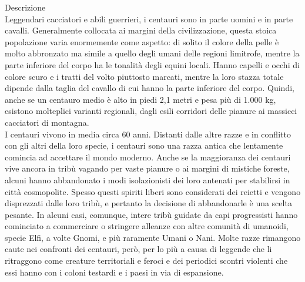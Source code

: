 \begin{multicols}{2}
Descrizione\\
Leggendari cacciatori e abili guerrieri, i centauri sono in parte uomini e in parte cavalli. Generalmente collocata ai margini della civilizzazione, questa stoica popolazione varia enormemente come aspetto: di solito il colore della pelle è molto abbronzato ma simile a quello degli umani delle regioni limitrofe, mentre la parte inferiore del corpo ha le tonalità degli equini locali. Hanno capelli e occhi di colore scuro e i tratti del volto piuttosto marcati, mentre la loro stazza totale dipende dalla taglia del cavallo di cui hanno la parte inferiore del corpo. Quindi, anche se un centauro medio è alto in piedi 2,1 metri e pesa più di 1.000 kg, esistono molteplici varianti regionali, dagli esili corridori delle pianure ai massicci cacciatori di montagna.\\
I centauri vivono in media circa 60 anni. Distanti dalle altre razze e in conflitto con gli altri della loro specie, i centauri sono una razza antica che lentamente comincia ad accettare il mondo moderno. Anche se la maggioranza dei centauri vive ancora in tribù vagando per vaste pianure o ai margini di mistiche foreste, alcuni hanno abbandonato i modi isolazionisti dei loro antenati per stabilirsi in città cosmopolite. Spesso questi spiriti liberi sono considerati dei reietti e vengono disprezzati dalle loro tribù, e pertanto la decisione di abbandonarle è una scelta pesante. In alcuni casi, comunque, intere tribù guidate da capi progressisti hanno cominciato a commerciare o stringere alleanze con altre comunità di umanoidi, specie Elfi, a volte Gnomi, e più raramente Umani o Nani. Molte razze rimangono caute nei confronti dei centauri, però, per lo più a causa di leggende che li ritraggono come creature territoriali e feroci e dei periodici scontri violenti che essi hanno con i coloni testardi e i paesi in via di espansione.\\


\end{multicols}

